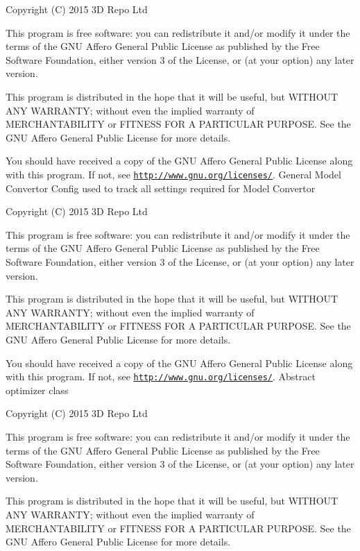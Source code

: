 Copyright (C) 2015 3\+D Repo Ltd

This program is free software\+: you can redistribute it and/or modify it under the terms of the G\+N\+U Affero General Public License as published by the Free Software Foundation, either version 3 of the License, or (at your option) any later version.

This program is distributed in the hope that it will be useful, but W\+I\+T\+H\+O\+U\+T A\+N\+Y W\+A\+R\+R\+A\+N\+T\+Y; without even the implied warranty of M\+E\+R\+C\+H\+A\+N\+T\+A\+B\+I\+L\+I\+T\+Y or F\+I\+T\+N\+E\+S\+S F\+O\+R A P\+A\+R\+T\+I\+C\+U\+L\+A\+R P\+U\+R\+P\+O\+S\+E. See the G\+N\+U Affero General Public License for more details.

You should have received a copy of the G\+N\+U Affero General Public License along with this program. If not, see \href{http://www.gnu.org/licenses/}{\tt http\+://www.\+gnu.\+org/licenses/}. General Model Convertor Config used to track all settings required for Model Convertor

Copyright (C) 2015 3\+D Repo Ltd

This program is free software\+: you can redistribute it and/or modify it under the terms of the G\+N\+U Affero General Public License as published by the Free Software Foundation, either version 3 of the License, or (at your option) any later version.

This program is distributed in the hope that it will be useful, but W\+I\+T\+H\+O\+U\+T A\+N\+Y W\+A\+R\+R\+A\+N\+T\+Y; without even the implied warranty of M\+E\+R\+C\+H\+A\+N\+T\+A\+B\+I\+L\+I\+T\+Y or F\+I\+T\+N\+E\+S\+S F\+O\+R A P\+A\+R\+T\+I\+C\+U\+L\+A\+R P\+U\+R\+P\+O\+S\+E. See the G\+N\+U Affero General Public License for more details.

You should have received a copy of the G\+N\+U Affero General Public License along with this program. If not, see \href{http://www.gnu.org/licenses/}{\tt http\+://www.\+gnu.\+org/licenses/}. Abstract optimizer class

Copyright (C) 2015 3\+D Repo Ltd

This program is free software\+: you can redistribute it and/or modify it under the terms of the G\+N\+U Affero General Public License as published by the Free Software Foundation, either version 3 of the License, or (at your option) any later version.

This program is distributed in the hope that it will be useful, but W\+I\+T\+H\+O\+U\+T A\+N\+Y W\+A\+R\+R\+A\+N\+T\+Y; without even the implied warranty of M\+E\+R\+C\+H\+A\+N\+T\+A\+B\+I\+L\+I\+T\+Y or F\+I\+T\+N\+E\+S\+S F\+O\+R A P\+A\+R\+T\+I\+C\+U\+L\+A\+R P\+U\+R\+P\+O\+S\+E. See the G\+N\+U Affero General Public License for more details.

